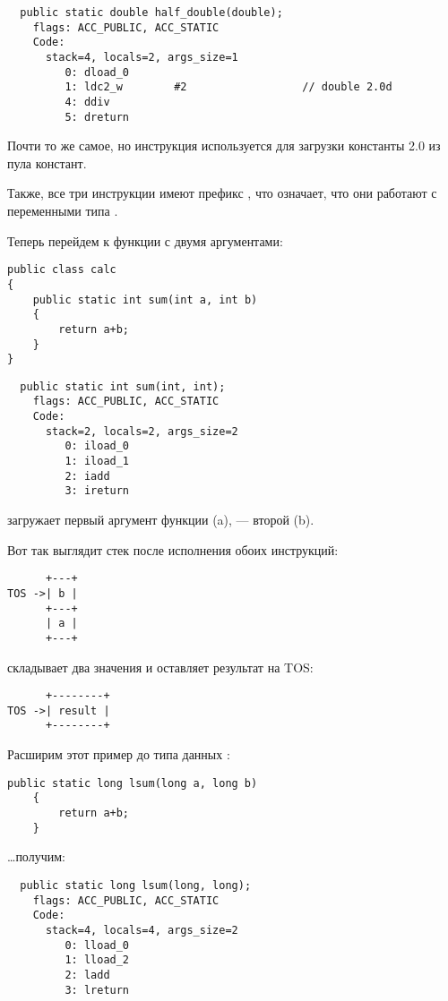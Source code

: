 \begin{lstlisting}
  public static double half_double(double);
    flags: ACC_PUBLIC, ACC_STATIC
    Code:
      stack=4, locals=2, args_size=1
         0: dload_0       
         1: ldc2_w        #2                  // double 2.0d
         4: ddiv          
         5: dreturn       
\end{lstlisting}


Почти то же самое, но инструкция  используется для загрузки константы 
2.0 из пула констант.

Также, все три инструкции имеют префикс , что означает, что они работают с переменными
типа .


Теперь перейдем к функции с двумя аргументами:

\begin{lstlisting}[style=customjava]
public class calc
{
	public static int sum(int a, int b)
	{
		return a+b;
	}
}
\end{lstlisting}

\begin{lstlisting}
  public static int sum(int, int);
    flags: ACC_PUBLIC, ACC_STATIC
    Code:
      stack=2, locals=2, args_size=2
         0: iload_0       
         1: iload_1       
         2: iadd          
         3: ireturn       
\end{lstlisting}


 загружает первый аргумент функции (a),  --- второй (b).

Вот так выглядит стек после исполнения обоих инструкций:

\begin{lstlisting}
      +---+
TOS ->| b |
      +---+
      | a |
      +---+
\end{lstlisting}


 складывает два значения и оставляет результат на \ac{TOS}:

\begin{lstlisting}
      +--------+
TOS ->| result |
      +--------+
\end{lstlisting}


Расширим этот пример до типа данных :

\begin{lstlisting}[style=customjava]
	public static long lsum(long a, long b)
	{
		return a+b;
	}
\end{lstlisting}

\dots получим:

\begin{lstlisting}
  public static long lsum(long, long);
    flags: ACC_PUBLIC, ACC_STATIC
    Code:
      stack=4, locals=4, args_size=2
         0: lload_0       
         1: lload_2       
         2: ladd          
         3: lreturn       
\end{lstlisting}


